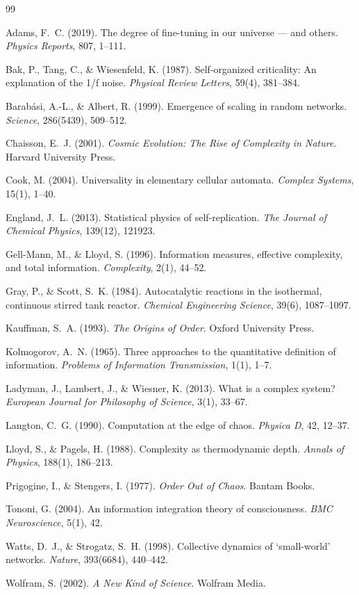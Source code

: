 \documentclass[12pt,a4paper]{article}
\begin{document}
\begin{thebibliography}{99}

Adams, F.~C. (2019).
The degree of fine-tuning in our universe --- and others.
\textit{Physics Reports}, 807, 1--111.

Bak, P., Tang, C., \& Wiesenfeld, K. (1987).
Self-organized criticality: An explanation of the 1/f noise.
\textit{Physical Review Letters}, 59(4), 381--384.

Barab{\'a}si, A.-L., \& Albert, R. (1999).
Emergence of scaling in random networks.
\textit{Science}, 286(5439), 509--512.

Chaisson, E.~J. (2001).
\textit{Cosmic Evolution: The Rise of Complexity in Nature}.
Harvard University Press.

Cook, M. (2004).
Universality in elementary cellular automata.
\textit{Complex Systems}, 15(1), 1--40.

England, J.~L. (2013).
Statistical physics of self-replication.
\textit{The Journal of Chemical Physics}, 139(12), 121923.

Gell-Mann, M., \& Lloyd, S. (1996).
Information measures, effective complexity, and total information.
\textit{Complexity}, 2(1), 44--52.

Gray, P., \& Scott, S.~K. (1984).
Autocatalytic reactions in the isothermal, continuous stirred tank reactor.
\textit{Chemical Engineering Science}, 39(6), 1087--1097.

Kauffman, S.~A. (1993).
\textit{The Origins of Order}.
Oxford University Press.

Kolmogorov, A.~N. (1965).
Three approaches to the quantitative definition of information.
\textit{Problems of Information Transmission}, 1(1), 1--7.

Ladyman, J., Lambert, J., \& Wiesner, K. (2013).
What is a complex system?
\textit{European Journal for Philosophy of Science}, 3(1), 33--67.

Langton, C.~G. (1990).
Computation at the edge of chaos.
\textit{Physica D}, 42, 12--37.

Lloyd, S., \& Pagels, H. (1988).
Complexity as thermodynamic depth.
\textit{Annals of Physics}, 188(1), 186--213.

Prigogine, I., \& Stengers, I. (1977).
\textit{Order Out of Chaos}.
Bantam Books.

Tononi, G. (2004).
An information integration theory of consciousness.
\textit{BMC Neuroscience}, 5(1), 42.

Watts, D.~J., \& Strogatz, S.~H. (1998).
Collective dynamics of `small-world' networks.
\textit{Nature}, 393(6684), 440--442.

Wolfram, S. (2002).
\textit{A New Kind of Science}.
Wolfram Media.

\end{thebibliography}
\end{document}
